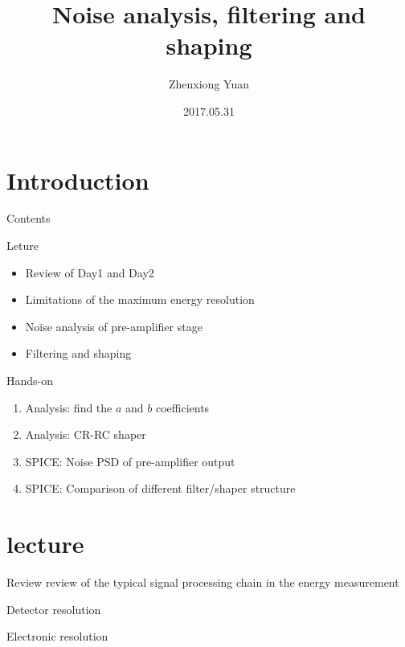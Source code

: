 \documentclass{beamer}
\title[HighRR Hands-on]{Noise analysis, filtering and shaping}
\author{Zhenxiong Yuan}
\institute{Where You're From}
\date{2017.05.31}
\begin{document}
\begin{frame}
  \titlepage
\end{frame}


\section{Introduction}

\begin{frame}{Contents}
\begin{block}{Leture}
\begin{itemize}
\item Review of Day1 and Day2
\item Limitations of the maximum energy resolution
\item Noise analysis of pre-amplifier stage
\item Filtering and shaping
\end{itemize}
\end{block}
\begin{block}{Hands-on}
\begin{enumerate}
\item Analysis: find the $a$ and $b$ coefficients
\item Analysis: CR-RC shaper
\item SPICE: Noise PSD of pre-amplifier output
\item SPICE: Comparison of different filter/shaper structure
\end{enumerate}
\end{block}
\end{frame}

\section{lecture}
\begin{frame}{Review}
review of the typical signal processing chain in the energy measurement
\end{frame}

\begin{frame}{Detector resolution}

\end{frame}

\begin{frame}{Electronic resolution}

\end{frame}
\end{document}
